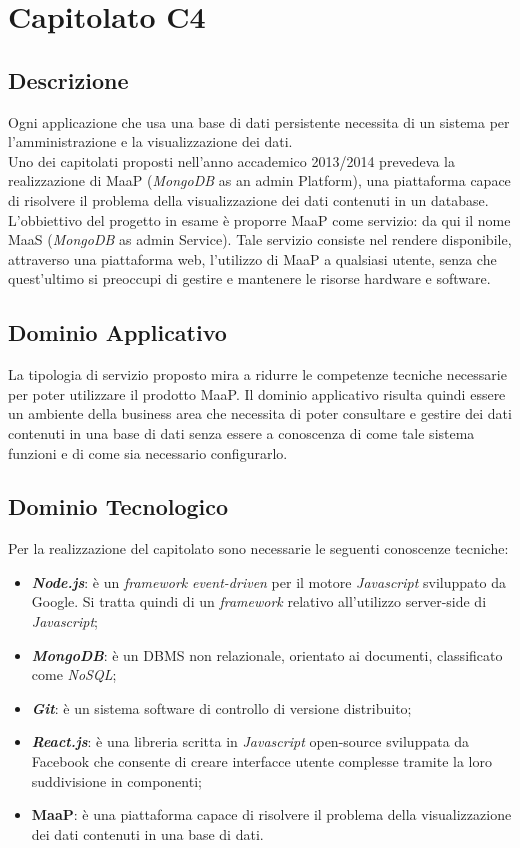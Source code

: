 \newpage
\section{Capitolato C4}
\subsection{Descrizione}
Ogni applicazione che usa una base di dati persistente necessita di un sistema per l'amministrazione e la visualizzazione dei dati.\\ Uno dei capitolati proposti nell'anno accademico 2013/2014 prevedeva la realizzazione di MaaP (\textit{MongoDB} as an admin Platform), una piattaforma capace di risolvere il problema della visualizzazione dei dati contenuti in un database.\\
L'obbiettivo del progetto in esame è proporre MaaP come servizio: da qui il nome MaaS (\textit{MongoDB} as admin Service). Tale servizio consiste nel rendere disponibile, attraverso una piattaforma web, l'utilizzo di MaaP a qualsiasi utente, senza che quest'ultimo si preoccupi di gestire e mantenere le risorse hardware e software.

\subsection{Dominio Applicativo}
La tipologia di servizio proposto mira a ridurre le competenze tecniche necessarie per poter utilizzare il prodotto MaaP. Il dominio applicativo risulta quindi essere un ambiente della business area che necessita di poter consultare e gestire dei dati contenuti in una base di dati senza essere a conoscenza di come tale sistema funzioni e di come sia necessario configurarlo.

\subsection{Dominio Tecnologico}
Per la realizzazione del capitolato sono necessarie le seguenti conoscenze tecniche:
\begin{itemize}
	\item \textbf{\textit{Node.js}}: è un \textit{framework} \textit{event-driven} per il motore \textit{Javascript} sviluppato da Google. Si tratta quindi di un \textit{framework} relativo all'utilizzo server-side di \textit{Javascript};
	\item \textbf{\textit{MongoDB}}: è un DBMS non relazionale, orientato ai documenti, classificato come \textit{NoSQL};
	\item \textbf{\textit{Git}}: è un sistema software di controllo di versione distribuito;
	\item \textbf{\textit{React.js}}: è una libreria scritta in \textit{Javascript} open-source sviluppata da Facebook che consente di creare interfacce utente complesse tramite la loro suddivisione in componenti;
	\item \textbf{MaaP}: è una piattaforma capace di risolvere il problema della visualizzazione dei dati contenuti in una base di dati.
\end{itemize}

